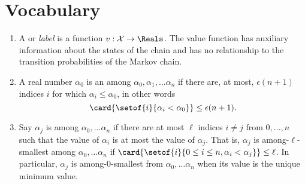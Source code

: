 \documentclass[12pt]{article}
\begin{document}
\section*{Vocabulary}
\begin{enumerate}
    \item
        A  or \emph{label} is a function \( v :
        \mathcal{X} \to \Reals \).  The value function has
        auxiliary information about the states of the chain and has no
        relationship to the transition probabilities
        of the Markov chain.
    \item
        A real number \( \alpha_0 \) is an 
        among \( \alpha_0, \alpha_1, \dots \alpha_n \) if there are, at
        most, \( \epsilon(n + 1) \) indices \( i \) for which \( \alpha_i
        \le \alpha_0 \), in other words
        \[
          \card{ \setof{i}{\alpha_i < \alpha_0}} \le \epsilon(n+1).
        \]
        
    \item
        Say \( \alpha_j \) is  among \(
        \alpha_0, \dots \alpha_n \) if there are at most \( \ell \)
        indices \( i \ne j \) from \( 0, \dots, n \) such that the value
        of \( \alpha_i \) is at most the value of \( \alpha_j \).  That
        is, \( \alpha_j \) is among-\( \ell \)-smallest among \( \alpha_0,
        \dots \alpha_n \) if \( \card{ \setof{i}{0 \le i \le n, \alpha_i
        < \alpha_j}} \le \ell \).  In particular, \( \alpha_j \) is
        among-\( 0 \)-smallest from \( \alpha_0, \dots \alpha_n \) when
        its value is the unique minimum value.
\end{enumerate}

\hr
\end{document}
